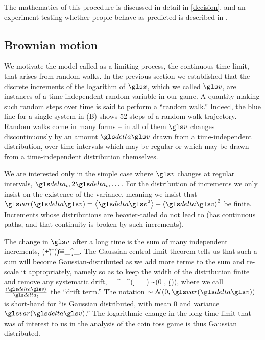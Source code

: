 The mathematics of this procedure is discussed in detail in \cref{decision}, and an
experiment testing whether people behave as predicted is described in .

\subsection{Brownian motion}
We motivate the model called \BM as a limiting process, the continuous-time limit, that arises from random walks.
In the previous section we established that the discrete increments of the logarithm of 
$\x$, which we called $\gv$, are instances of a time-independent random variable in our game. A quantity 
making such random steps over time is said to perform a ``random walk.'' 
Indeed, the blue line for a single system in  (B) shows 52 steps of a random walk trajectory.
Random walks come in many forms -- in all of them $\gv$ changes discontinuously by an amount 
$\d \gv$ drawn from a time-independent distribution, over time intervals which may be regular or which may be drawn from a time-independent distribution themselves.

We are interested only in the simple case where $\gv$ changes at regular intervals, $\dt, 2\dt, \dots$. For 
the distribution of increments we only insist on the existence of the variance, meaning we insist that 
$\var(\d \gv)=\ave{\d \gv^2}-\ave{\d \gv}^2$ be finite. Increments whose distributions are heavier-tailed do 
not lead to \BM (\BM has continuous paths, and that continuity 
is broken by such increments).

The change in $\gv$ after a long time is the sum 
of many independent increments, 
\be
\gv(\t+\T\dt)-\gv(\t)=\sum_\gi^\T \d \gv_\gi.
\ee
The Gaussian central limit theorem tells us that such a sum will become 
Gaussian-distributed as we add more terms to the sum and re-scale it appropriately, namely so as to keep the width of the distribution finite and  remove any systematic drift,
\be
\lim_{\T\to\infty} ^{}\sum_\gi^\T ( \d \gv_\gi \underbrace{-\ave{\d \gv}}_{}) \sim \mathcal{\N}(0 , \var(\d \gv)),
\ee
where we call $\frac{\ave{\d \gv}}{\dt}$ the ``drift term.'' The notation $\sim \mathcal{N}(0, \var(\d \gv))$ is short-hand for ``is Gaussian distributed, with mean $0$ and variance $\var(\d \gv)$.''
The logarithmic change in the 
long-time limit that was of interest to us in the analysis of the coin toss game is thus 
Gaussian distributed. 

